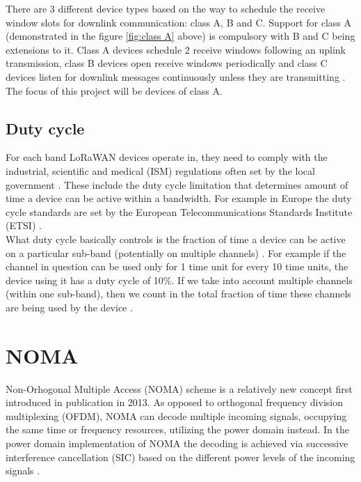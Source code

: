 There are 3 different device types based on the way to schedule the receive window slots for downlink communication: class A, B and C. Support for class A (demonstrated in the figure \ref{fig:class A} above) is compulsory with B and C being extensions to it. Class A devices schedule 2 receive windows following an uplink transmission, class B devices open receive windows periodically and class C devices listen for downlink messages continuously unless they are transmitting \cite{lora_alliance_spec}. 
The focus of this project will be devices of 
class A.

\subsection{Duty cycle}
For each band LoRaWAN devices operate in, they need to comply with the industrial, scientific and medical (ISM) regulations often set by the local government \cite{duty_cycle}. These include the duty cycle limitation that determines amount of time a device can be active within a bandwidth. For example in Europe the duty cycle standards are set by the 
European Telecommunications Standards Institute (ETSI) \cite{about_etsi}.\\

What duty cycle basically controls is the fraction of time a device can be active on a particular sub-band (potentially on multiple channels) \cite{duty_cycle}. For example if the channel in 
question can be used only for 1 time unit for every 10 time units, 
the device using it has a duty cycle of 10\%. If we take into account multiple channels (within one sub-band), then we count in the total fraction of time these channels are being used by the device \cite{duty_cycle}.

\section{NOMA}
 
 Non-Orhogonal Multiple Access (NOMA) scheme is a relatively new concept first introduced in publication \cite{noma_original} in 2013. As opposed to orthogonal
frequency division multiplexing (OFDM), NOMA can decode multiple incoming signals, occupying the same time or frequency resources, utilizing the power domain instead.
In the power domain implementation of NOMA the decoding is achieved via successive interference cancellation (SIC) based on the different power levels of the incoming signals \cite{noma_original}. \\

